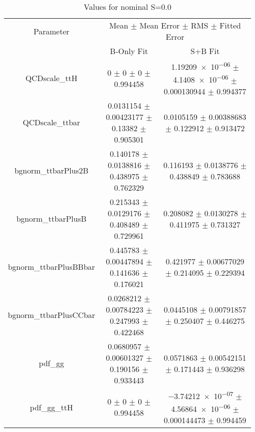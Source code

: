 \begin{table}
\centering
\caption{Values for nominal S=0.0}
\begin{tabular}{ccc}
\toprule
Parameter & \multicolumn{2}{c}{Mean $\pm$ Mean Error $\pm$ RMS $\pm$ Fitted Error}\\
 & B-Only Fit & S+B Fit\\
\midrule
QCDscale\_ttH & \num{0} $\pm$ \num{0} $\pm$ \num{0} $\pm$ \num{0.994458} & \num{1.19209e-06} $\pm$ \num{4.1408e-06} $\pm$ \num{0.000130944} $\pm$ \num{0.994377}\\
QCDscale\_ttbar & \num{0.0131154} $\pm$ \num{0.00423177} $\pm$ \num{0.13382} $\pm$ \num{0.905301} & \num{0.0105159} $\pm$ \num{0.00388683} $\pm$ \num{0.122912} $\pm$ \num{0.913472}\\
bgnorm\_ttbarPlus2B & \num{0.140178} $\pm$ \num{0.0138816} $\pm$ \num{0.438975} $\pm$ \num{0.762329} & \num{0.116193} $\pm$ \num{0.0138776} $\pm$ \num{0.438849} $\pm$ \num{0.783688}\\
bgnorm\_ttbarPlusB & \num{0.215343} $\pm$ \num{0.0129176} $\pm$ \num{0.408489} $\pm$ \num{0.729961} & \num{0.208082} $\pm$ \num{0.0130278} $\pm$ \num{0.411975} $\pm$ \num{0.731327}\\
bgnorm\_ttbarPlusBBbar & \num{0.445783} $\pm$ \num{0.00447894} $\pm$ \num{0.141636} $\pm$ \num{0.176021} & \num{0.421977} $\pm$ \num{0.00677029} $\pm$ \num{0.214095} $\pm$ \num{0.229394}\\
bgnorm\_ttbarPlusCCbar & \num{0.0268212} $\pm$ \num{0.00784223} $\pm$ \num{0.247993} $\pm$ \num{0.422468} & \num{0.0445108} $\pm$ \num{0.00791857} $\pm$ \num{0.250407} $\pm$ \num{0.446275}\\
pdf\_gg & \num{0.0680957} $\pm$ \num{0.00601327} $\pm$ \num{0.190156} $\pm$ \num{0.933443} & \num{0.0571863} $\pm$ \num{0.00542151} $\pm$ \num{0.171443} $\pm$ \num{0.936298}\\
pdf\_gg\_ttH & \num{0} $\pm$ \num{0} $\pm$ \num{0} $\pm$ \num{0.994458} & \num{-3.74212e-07} $\pm$ \num{4.56864e-06} $\pm$ \num{0.000144473} $\pm$ \num{0.994459}\\
\bottomrule
\end{tabular}
\end{table}